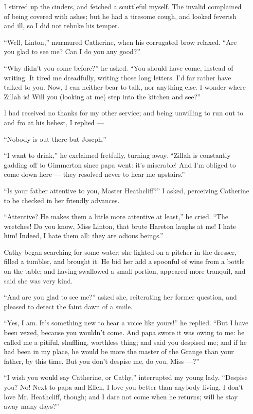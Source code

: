 \par I stirred up the cinders, and fetched a scuttleful myself. The invalid complained of being covered with ashes; but he had a tiresome cough, and looked feverish and ill, so I did not rebuke his temper.
\par “Well, Linton,” murmured Catherine, when his corrugated brow relaxed. “Are you glad to see me? Can I do you any good?”
\par “Why didn't you come before?” he asked. “You should have come, instead of writing. It tired me dreadfully, writing those long letters. I'd far rather have talked to you. Now, I can neither bear to talk, nor anything else. I wonder where Zillah is! Will you (looking at me) step into the kitchen and see?”
\par I had received no thanks for my other service; and being unwilling to run out to and fro at his behest, I replied —
\par “Nobody is out there but Joseph.”
\par “I want to drink,” he exclaimed fretfully, turning away. “Zillah is constantly gadding off to Gimmerton since papa went: it's miserable! And I'm obliged to come down here — they resolved never to hear me upstairs.”
\par “Is your father attentive to you, Master Heathcliff?” I asked, perceiving Catherine to be checked in her friendly advances.
\par “Attentive? He makes them a little more attentive at least,” he cried. “The wretches! Do you know, Miss Linton, that brute Hareton laughs at me! I hate him! Indeed, I hate them all: they are odious beings.”
\par Cathy began searching for some water; she lighted on a pitcher in the dresser, filled a tumbler, and brought it. He bid her add a spoonful of wine from a bottle on the table; and having swallowed a small portion, appeared more tranquil, and said she was very kind.
\par “And are you glad to see me?” asked she, reiterating her former question, and pleased to detect the faint dawn of a smile.
\par “Yes, I am. It's something new to hear a voice like yours!” he replied. “But I have been vexed, because you wouldn't come. And papa swore it was owing to me: he called me a pitiful, shuffling, worthless thing; and said you despised me; and if he had been in my place, he would be more the master of the Grange than your father, by this time. But you don't despise me, do you, Miss —?”
\par “I wish you would say Catherine, or Cathy,” interrupted my young lady. “Despise you? No! Next to papa and Ellen, I love you better than anybody living. I don't love Mr. Heathcliff, though; and I dare not come when he returns; will he stay away many days?”
